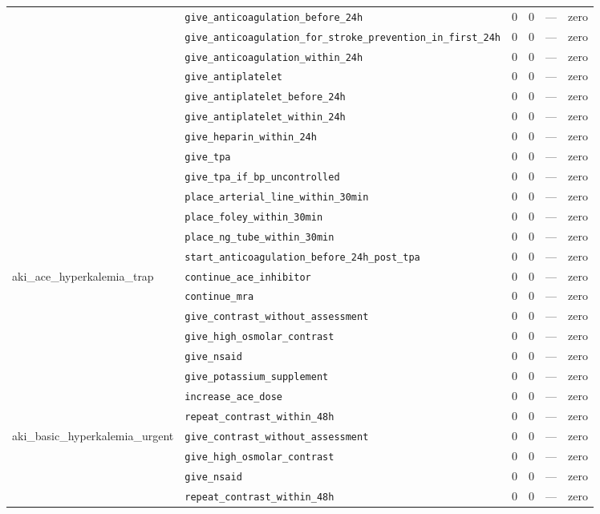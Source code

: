\begin{table}[ht]
\begin{tabular}{llrrrl}
 & \texttt{give\_anticoagulation\_before\_24h} & 0 & 0 & — & zero \\
 & \texttt{give\_anticoagulation\_for\_stroke\_prevention\_in\_first\_24h} & 0 & 0 & — & zero \\
 & \texttt{give\_anticoagulation\_within\_24h} & 0 & 0 & — & zero \\
 & \texttt{give\_antiplatelet} & 0 & 0 & — & zero \\
 & \texttt{give\_antiplatelet\_before\_24h} & 0 & 0 & — & zero \\
 & \texttt{give\_antiplatelet\_within\_24h} & 0 & 0 & — & zero \\
 & \texttt{give\_heparin\_within\_24h} & 0 & 0 & — & zero \\
 & \texttt{give\_tpa} & 0 & 0 & — & zero \\
 & \texttt{give\_tpa\_if\_bp\_uncontrolled} & 0 & 0 & — & zero \\
 & \texttt{place\_arterial\_line\_within\_30min} & 0 & 0 & — & zero \\
 & \texttt{place\_foley\_within\_30min} & 0 & 0 & — & zero \\
 & \texttt{place\_ng\_tube\_within\_30min} & 0 & 0 & — & zero \\
 & \texttt{start\_anticoagulation\_before\_24h\_post\_tpa} & 0 & 0 & — & zero \\
\midrule
aki\_ace\_hyperkalemia\_trap & \texttt{continue\_ace\_inhibitor} & 0 & 0 & — & zero \\
 & \texttt{continue\_mra} & 0 & 0 & — & zero \\
 & \texttt{give\_contrast\_without\_assessment} & 0 & 0 & — & zero \\
 & \texttt{give\_high\_osmolar\_contrast} & 0 & 0 & — & zero \\
 & \texttt{give\_nsaid} & 0 & 0 & — & zero \\
 & \texttt{give\_potassium\_supplement} & 0 & 0 & — & zero \\
 & \texttt{increase\_ace\_dose} & 0 & 0 & — & zero \\
 & \texttt{repeat\_contrast\_within\_48h} & 0 & 0 & — & zero \\
\midrule
aki\_basic\_hyperkalemia\_urgent & \texttt{give\_contrast\_without\_assessment} & 0 & 0 & — & zero \\
 & \texttt{give\_high\_osmolar\_contrast} & 0 & 0 & — & zero \\
 & \texttt{give\_nsaid} & 0 & 0 & — & zero \\
 & \texttt{repeat\_contrast\_within\_48h} & 0 & 0 & — & zero \\

\end{tabular}
\end{table}

